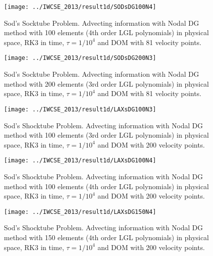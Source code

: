 \begin{frame}
		\begin{figure}
			\centering
				\texttt{[image: ../IWCSE\_2013/result1d/SODsDG100N4]}
			\caption{Sod's  Socktube Problem. Advecting information with Nodal DG method with 100 elements (4th order LGL polynomials) in physical space, RK3 in time, $\tau = 1/10^4$ and DOM with 81 velocity points.}
			\label{fig:SODsDG100N4}
		\end{figure}
\end{frame}

\begin{frame}
		\begin{figure}
			\centering
				\texttt{[image: ../IWCSE\_2013/result1d/SODsDG200N3]}
			\caption{Sod's  Socktube Problem. Advecting information with Nodal DG method with 200 elements (3rd order LGL polynomials) in physical space, RK3 in time, $\tau = 1/10^4$ and DOM with 81 velocity points.}
			\label{fig:SODsDG200N3}
		\end{figure}
\end{frame}

\begin{frame}
		\begin{figure}
			\centering
				\texttt{[image: ../IWCSE\_2013/result1d/LAXsDG100N3]}
			\caption{Sod's Shocktube Problem. Advecting information with Nodal DG method with 100 elements (3rd order LGL polynomials) in physical space, RK3 in time, $\tau = 1/10^4$ and DOM with 200 velocity points.}
			\label{fig:LAXsDG100N3}
		\end{figure}
\end{frame}

\begin{frame}
		\begin{figure}
			\centering
				\texttt{[image: ../IWCSE\_2013/result1d/LAXsDG100N4]}
			\caption{Sod's Shocktube Problem. Advecting information with Nodal DG method with 100 elements (4th order LGL polynomials) in physical space, RK3 in time, $\tau = 1/10^4$ and DOM with 200 velocity points.}
			\label{fig:LAXsDG100N4}
		\end{figure}
\end{frame}

\begin{frame}
		\begin{figure}
			\centering
				\texttt{[image: ../IWCSE\_2013/result1d/LAXsDG150N4]}
			\caption{Sod's Shocktube Problem. Advecting information with Nodal DG method with 150 elements (4th order LGL polynomials) in physical space, RK3 in time, $\tau = 1/10^4$ and DOM with 200 velocity points.}
			\label{fig:LAXsDG150N4}
		\end{figure}
\end{frame}

